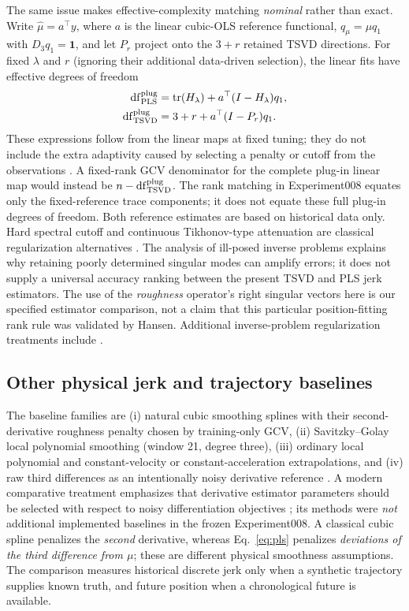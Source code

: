 The same issue makes effective-complexity matching
\emph{nominal} rather than exact. Write
$\widehat\mu=a^\top y$, where $a$ is the linear
cubic-OLS reference functional, $q_\mu=\mu q_1$
with $D_3q_1=\mathbf1$, and let $P_r$ project
onto the $3+r$ retained TSVD directions.
For fixed $\lambda$ and $r$ (ignoring their
additional data-driven selection), the
linear fits have effective degrees of freedom
\begin{align}
\operatorname{df}_{\rm PLS}^{\rm plug}
 &=\operatorname{tr}(H_\lambda)
  +a^\top(I-H_\lambda)q_1,\\
\operatorname{df}_{\rm TSVD}^{\rm plug}
 &=3+r+a^\top(I-P_r)q_1 .
\end{align}
These expressions follow from the linear maps at fixed tuning;
they do not include the extra adaptivity caused by selecting a
penalty or cutoff from the observations
\citep{ye1998,efron2004}.
A fixed-rank GCV denominator for the complete
plug-in linear map would instead be
$n-\operatorname{df}_{\rm TSVD}^{\rm plug}$.
The rank matching in Experiment008 equates
only the fixed-reference trace components;
it does not equate these full plug-in
degrees of freedom. Both reference
estimates are based on historical data only.
Hard spectral cutoff and continuous Tikhonov-type attenuation
are classical regularization alternatives \citep{hansen1990tsvd}.
The analysis of ill-posed inverse problems explains why
retaining poorly determined singular modes can amplify errors;
it does not supply a universal accuracy ranking between
the present TSVD and PLS jerk estimators.
The use of the \emph{roughness} operator's right singular vectors
here is our specified estimator comparison, not a claim that this
particular position-fitting rank rule was validated by Hansen.
Additional inverse-problem regularization treatments include
\citet{renaut2019tsvd}.

\subsection{Other physical jerk and trajectory baselines}
The baseline families are (i) natural cubic smoothing
splines with their second-derivative roughness penalty
chosen by training-only GCV, (ii) Savitzky--Golay local
polynomial smoothing (window 21, degree three),
(iii) ordinary local polynomial and constant-velocity
or constant-acceleration extrapolations, and
(iv) raw third differences as an intentionally noisy
derivative reference \citep{reinsch1967,wahba1990,craven1979,savitzky1964,ahnert2007,cao2021}.
A modern comparative treatment emphasizes that derivative
estimator parameters should be selected with respect to noisy
differentiation objectives \citep{vanbreugel2020}; its
methods were \emph{not} additional implemented baselines
in the frozen Experiment008.
A classical cubic spline penalizes the \emph{second}
derivative, whereas Eq.~\eqref{eq:pls} penalizes
\emph{deviations of the third difference from $\mu$};
these are different physical smoothness assumptions.
The comparison measures historical discrete jerk only
when a synthetic trajectory supplies known truth, and
future position when a chronological future is available.

